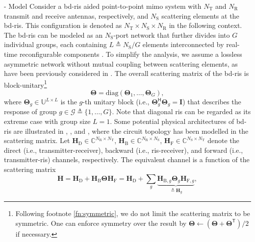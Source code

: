 \documentclass[journal]{IEEEtran}
\begin{document}
\begin{section}{- Model}
	Consider a \gls{bd}-\gls{ris} aided point-to-point \gls{mimo} system with $N_\mathrm{T}$ and $N_\mathrm{R}$ transmit and receive antennas, respectively, and $N_\mathrm{S}$ scattering elements at the \gls{bd}-\gls{ris}.
	This configuration is denoted as $N_\mathrm{T} \times N_\mathrm{S} \times N_\mathrm{R}$ in the following context.
	The \gls{bd}-\gls{ris} can be modeled as an $N_\mathrm{S}$-port network \cite{Ivrlac2010} that further divides into $G$ individual groups, each containing $L \triangleq N_\mathrm{S} / G$ elements interconnected by real-time reconfigurable components \cite{Shen2020a}.
	To simplify the analysis, we assume a lossless asymmetric network without mutual coupling between scattering elements, as have been previously considered in \cite{Li2023b,Li2023c,Bartoli2023}.
	The overall scattering matrix of the \gls{bd}-\gls{ris} is block-unitary\footnote{Following footnote \ref{fn:symmetric}, we do not limit the scattering matrix to be symmetric. One can enforce symmetry over the result by $\mathbf{\Theta} \gets (\mathbf{\Theta} + \mathbf{\Theta}^\mathsf{T})/2$ if necessary.}
	\begin{equation}
		\mathbf{\Theta} = \mathrm{diag}(\mathbf{\Theta}_1,\ldots,\mathbf{\Theta}_G),
		\label{eq:bd_ris}
	\end{equation}
	where $\mathbf{\Theta}_g \in \mathbb{U}^{L \times L}$ is the $g$-th unitary block (i.e., $\mathbf{\Theta}_g^\mathsf{H} \mathbf{\Theta}_g = \mathbf{I}$) that describes the response of group $g \in \mathcal{G} \triangleq \{1, \ldots, G\}$.
	Note that diagonal \gls{ris} can be regarded as its extreme case with group size $L=1$.
	Some potential physical architectures of \gls{bd}-\gls{ris} are illustrated in \cite[Fig. 3]{Shen2020a}, \cite[Fig. 5]{Li2023c}, and \cite[Fig. 2]{Nerini2024}, where the
	circuit topology has been modelled in the scattering matrix.
	Let $\mathbf{H}_\mathrm{D} \in \mathbb{C}^{N_\mathrm{R} \times N_\mathrm{T}}$, $\mathbf{H}_\mathrm{B} \in \mathbb{C}^{N_\mathrm{R} \times N_\mathrm{S}}$, $\mathbf{H}_\mathrm{F} \in \mathbb{C}^{N_\mathrm{S} \times N_\mathrm{T}}$ denote the direct (i.e., transmitter-receiver), backward (i.e., \gls{ris}-receiver), and forward (i.e., transmitter-\gls{ris}) channels, respectively.
	The equivalent channel is a function of the scattering matrix
	\begin{equation}
		\mathbf{H} = \mathbf{H}_\mathrm{D} + \mathbf{H}_\mathrm{B} \mathbf{\Theta} \mathbf{H}_\mathrm{F} = \mathbf{H}_\mathrm{D} + \sum_g \underbrace{\mathbf{H}_{\mathrm{B},g} \mathbf{\Theta}_g \mathbf{H}_{\mathrm{F},g}}_{\triangleq \mathbf{H}_g},

\end{equation}
\end{section}
\end{document}
